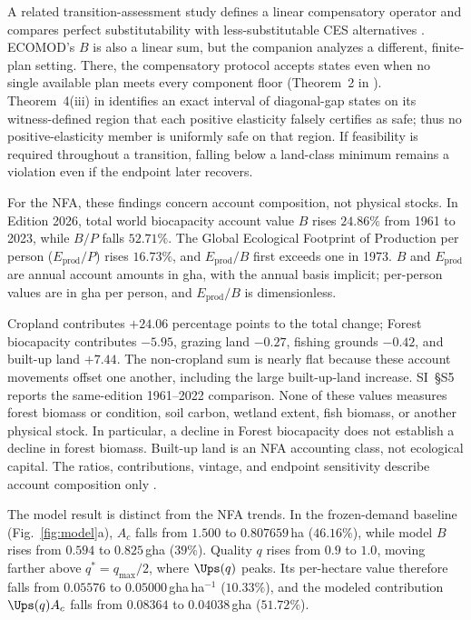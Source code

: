 A related transition-assessment study defines a linear compensatory operator and compares perfect substitutability with less-substitutable CES alternatives \citep[Sections~2 and 4 of][]{Abaee2026b}. ECOMOD's $B$ is also a linear sum, but the companion analyzes a different, finite-plan setting. There, the compensatory protocol accepts states even when no single available plan meets every component floor (Theorem~2 in \citet{Abaee2026b}). Theorem~4(iii) in \citet{Abaee2026b} identifies an exact interval of diagonal-gap states on its witness-defined region that each positive elasticity falsely certifies as safe; thus no positive-elasticity member is uniformly safe on that region. If feasibility is required throughout a transition, falling below a land-class minimum remains a violation even if the endpoint later recovers.

For the NFA, these findings concern account composition, not physical stocks. In Edition 2026, total world biocapacity account value $B$ rises $24.86\%$ from 1961 to 2023, while $B/P$ falls $52.71\%$. The Global Ecological Footprint of Production per person ($E_{\mathrm{prod}}/P$) rises $16.73\%$, and $E_{\mathrm{prod}}/B$ first exceeds one in 1973. $B$ and $E_{\mathrm{prod}}$ are annual account amounts in gha, with the annual basis implicit; per-person values are in gha per person, and $E_{\mathrm{prod}}/B$ is dimensionless.

Cropland contributes $+24.06$ percentage points to the total change; Forest biocapacity contributes $-5.95$, grazing land $-0.27$, fishing grounds $-0.42$, and built-up land $+7.44$. The non-cropland sum is nearly flat because these account movements offset one another, including the large built-up-land increase. SI~\S S5 reports the same-edition 1961--2022 comparison. None of these values measures forest biomass or condition, soil carbon, wetland extent, fish biomass, or another physical stock. In particular, a decline in Forest biocapacity does not establish a decline in forest biomass. Built-up land is an NFA accounting class, not ecological capital. The ratios, contributions, vintage, and endpoint sensitivity describe account composition only \citep{Lo2026NFA,Borucke2013,Blomqvist2013,GiampietroSaltelli2014,Galli2016,vdBerghGrazi2015}.

The model result is distinct from the NFA trends. In the frozen-demand baseline (Fig.~\ref{fig:model}a), $A_c$ falls from $1.500$ to $0.807659$\,ha ($46.16\%$), while model $B$ rises from $0.594$ to $0.825$\,gha ($39\%$). Quality $q$ rises from $0.9$ to $1.0$, moving farther above $q^*=q_{\max}/2$, where $\Ups(q)$ peaks. Its per-hectare value therefore falls from $0.05576$ to $0.05000$\,gha\,ha$^{-1}$ ($10.33\%$), and the modeled contribution $\Ups(q)A_c$ falls from $0.08364$ to $0.04038$\,gha ($51.72\%$).

